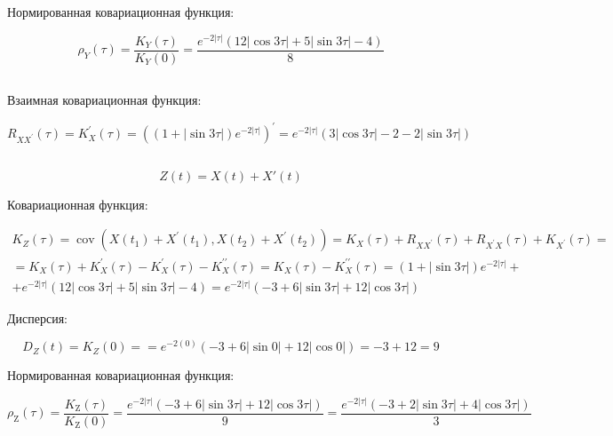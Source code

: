 \documentclass[12 pt]{article}
\begin{document}
Нормированная ковариационная функция:

\begin{equation}
	\rho_{Y}(\tau)=\frac{K_{Y}(\tau)}{K_{Y}(0)}=\frac{e^{-2|\tau|}(12|\cos 3 \tau|+5|\sin 3 \tau|-4)}{8}
\end{equation}



\newpage
\subsection{}
Взаимная ковариационная функция:

\begin{equation}
	R_{X X^{\prime}}(\tau)=K_{X}^{\prime}(\tau)=\left((1+|\sin 3 \tau|) e^{-2|\tau|}\right)^{\prime}=e^{-2|\tau|}(3|\cos 3 \tau|-2-2|\sin 3 \tau|)
\end{equation}


\newpage

\subsection{}

\begin{equation}
	Z(t) = X(t) + X'(t)
\end{equation}

Ковариационная функция:

\begin{equation}
	\begin{array}{l}
	K_{Z}(\tau)=\operatorname{cov}\left(X\left(t_{1}\right)+X^{\prime}\left(t_{1}\right), X\left(t_{2}\right)+X^{\prime}\left(t_{2}\right)\right)=K_{X}(\tau)+R_{X X^{\prime}}(\tau)+R_{X^{\prime} X}(\tau)+K_{X^{\prime}}(\tau)= \\
	=K_{X}(\tau)+K_{X}^{\prime}(\tau)-K_{X}^{\prime}(\tau)-K_{X}^{\prime \prime}(\tau)=K_{X}(\tau)-K_{X}^{\prime \prime}(\tau)=(1+|\sin 3 \tau|) e^{-2|\tau|}+ \\
	+e^{-2|\tau|}(12|\cos 3 \tau|+5|\sin 3 \tau|-4)=e^{-2|\tau|}(-3+6|\sin 3 \tau|+12|\cos 3 \tau|)
	\end{array}
\end{equation}

Дисперсия:

\begin{equation}
	D_{Z}(t)=K_{Z}(0)==e^{-2(0)}(-3+6|\sin 0|+12|\cos 0|)=-3+12=9
\end{equation}

Нормированная ковариационная функция:

\begin{equation}
	\rho_{\mathrm{Z}}(\tau)=\frac{K_{\mathrm{Z}}(\tau)}{K_{\mathrm{Z}}(0)}=\frac{e^{-2|\tau|}(-3+6|\sin 3 \tau|+12|\cos 3 \tau|)}{9}=\frac{e^{-2|\tau|}(-3+2|\sin 3 \tau|+4|\cos 3 \tau|)}{3}
\end{equation}
\end{document}
